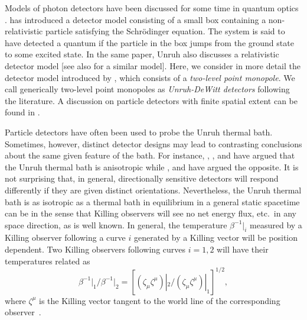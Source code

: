\documentclass[12pt,nofootinbib,floatfix,aps,prd,showpacs,amsmath,amssymb,eqsecnum]{revtex4-2}
\let\cite\citep
\begin{document}
Models of photon detectors have been discussed 
for some time in
quantum optics \cite{Glauber63}. \textcite{Unruh76} has introduced
a detector model consisting of a small box containing
a non-relativistic particle satisfying the Schr\"odinger equation. 
The system is said to have detected a quantum
if the particle 
in the box jumps from the ground state to some excited state.
In the same paper, Unruh also discusses a relativistic detector model
[see also \textcite{Sanchez81} for a similar model]. Here, we 
consider in more detail the detector model introduced by 
\textcite{DeWitt79}, which consists of a {\em two-level point 
monopole}.  
We call generically
two-level point monopoles as {\em Unruh-DeWitt detectors}
following the literature.  
A discussion 
on particle detectors with finite spatial extent can be found in 
\textcite{Groveetal83}.

Particle detectors have 
often been used to probe the Unruh 
thermal bath. Sometimes, however, distinct detector designs may 
lead to contrasting conclusions about the same given feature of the bath. 
For instance, \textcite{Israeletal83}, \textcite{Sanchez85},
\textcite{Hintonetal83} and \textcite{Hinton83} 
have argued that the Unruh thermal bath is anisotropic while 
\textcite{Kolbenstvedt87}, \textcite{Gerlach83} and 
\textcite{Groveetal85} have argued the opposite. 
It is not surprising that, in general, directionally sensitive detectors 
will respond differently 
if they are given distinct orientations. Nevertheless,
the Unruh thermal bath is as isotropic as a thermal bath in equilibrium 
in a general static spacetime can be in the sense 
that Killing observers will see 
no net energy flux, etc.~in 
any space direction, as is well known. In general, the temperature
$\beta^{-1}|_i$ measured by a Killing observer following a curve $i$
generated by a Killing vector 
will be position dependent. Two Killing observers 
following curves $i=1,2$ will have their temperatures related as 
$$
{\beta^{-1}|_1}/{\beta^{-1}|_2} =  
[(\zeta_{\mu} \zeta^{\mu})|_2/(\zeta_{\mu} \zeta^{\mu})|_1]^{1/2},
$$
where
$\zeta^{\mu}$  is the Killing vector tangent to the world line of
the corresponding observer~\cite{Tolman}.
\end{document}
